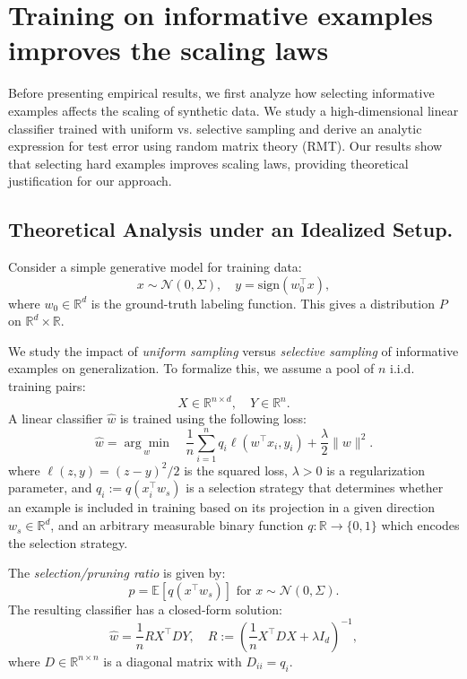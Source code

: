 \section{Training on informative examples improves the scaling laws}\label{sec:3}

Before presenting empirical results, we first analyze how selecting informative examples affects the scaling of synthetic data. We study a high-dimensional linear classifier trained with uniform vs. selective sampling and derive an analytic expression for test error using random matrix theory (RMT). Our results show that selecting hard examples improves scaling laws, providing theoretical justification for our approach.


\subsection{Theoretical Analysis under an Idealized Setup.}

Consider a simple generative model for training data:
\begin{equation}
    x \sim \mathcal{N}(0, \Sigma), \quad y = \text{sign}(w_0^\top x),
\end{equation}
where $w_0 \in \mathbb{R}^d$ is the ground-truth labeling function. This gives a distribution $P$ on $\mathbb R^{d} \times \mathbb R$.

We study the impact of \textit{uniform sampling} versus \textit{selective sampling} of informative examples on generalization. To formalize this, we assume a pool of $n$ i.i.d. training pairs:
{
\begin{equation}
    X \in \mathbb{R}^{n \times d}, \quad Y \in \mathbb{R}^{n}.
\end{equation}}
A linear classifier $\hat{w}$ is trained using the following loss:
\begin{equation}
    \hat{w} = \underset{w}{\arg\min} \quad \frac{1}{n} \sum_{i=1}^{n} q_i \ell(w^\top x_i, y_i) + \frac{\lambda}{2} \|w\|^2.
\end{equation}
where $\ell(z, y) = (z - y)^2/2$ is the squared loss, $\lambda > 0$ is a regularization parameter, and $q_i := q(x_i^\top w_s)$ is a selection strategy that determines whether an example is included in training based on its projection in a given direction $w_s \in \mathbb R^d$, and an arbitrary measurable binary function $q:\mathbb R \to \{0,1\}$ which encodes the selection strategy.

The \textit{selection/pruning ratio} is given by:
{
\begin{equation}
    p = \mathbb{E}[q(x^\top w_s)]\text{ for }x \sim \mathcal{N}(0, \Sigma).
\end{equation}}
The resulting classifier has a closed-form solution:
\begin{equation}
    \hat{w} = \frac{1}{n} R X^\top D Y, \quad R := \left(\frac{1}{n} X^\top D X + \lambda I_d \right)^{-1},
    \label{eq:estimator}
\end{equation}
where $D \in \mathbb{R}^{n \times n}$ is a diagonal matrix with $D_{ii} = q_i$.

